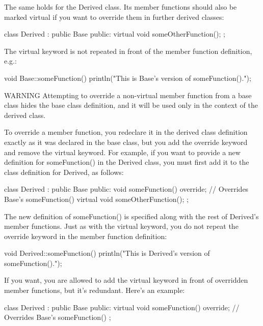 The same holds for the Derived class. Its member functions should also be marked virtual if you want to override them in further derived classes:

\begin{cpp}
class Derived : public Base
{
    public:
        virtual void someOtherFunction();
};
\end{cpp}

The virtual keyword is not repeated in front of the member function definition, e.g.:

\begin{cpp}
void Base::someFunction()
{
    println("This is Base's version of someFunction().");
}
\end{cpp}

\begin{myWarning}{WARNING}
Attempting to override a non-virtual member function from a base class hides the base class definition, and it will be used only in the context of the derived class.
\end{myWarning}


To override a member function, you redeclare it in the derived class definition exactly as it was declared in the base class, but you add the override keyword and remove the virtual keyword. For example, if you want to provide a new definition for someFunction() in the Derived class, you must first add it to the class definition for Derived, as follows:

\begin{cpp}
class Derived : public Base
{
    public:
        void someFunction() override; // Overrides Base's someFunction()
        virtual void someOtherFunction();
};
\end{cpp}

The new definition of someFunction() is specified along with the rest of Derived’s member functions. Just as with the virtual keyword, you do not repeat the override keyword in the member function definition:

\begin{cpp}
void Derived::someFunction()
{
    println("This is Derived's version of someFunction().");
}
\end{cpp}

If you want, you are allowed to add the virtual keyword in front of overridden member functions, but it’s redundant. Here’s an example:

\begin{cpp}
class Derived : public Base
{
    public:
        virtual void someFunction() override; // Overrides Base's someFunction()
};
\end{cpp}

